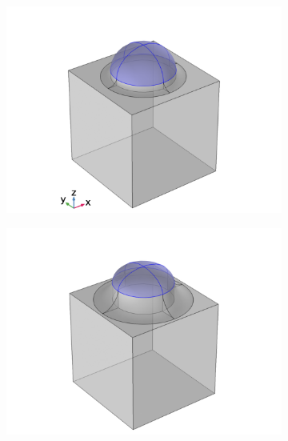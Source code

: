 \begin{figure}[htb!]
    \begin{subfigure}{0.24\textwidth}
        \centering
        \includegraphics[width=\linewidth, trim=2cm 0cm 2cm 0cm, clip]{figures/ch4/implem/geometry/Sample6_markedAu_xyz(1).png}
        \caption{}
    \end{subfigure}
    \begin{subfigure}{0.24\textwidth}
        \centering
        \includegraphics[width=\linewidth, trim=2cm 0cm 2cm 0cm, clip]{figures/ch4/implem/geometry/Sample5A_markedAu.png}
        \caption{}
    \end{subfigure}
    \begin{subfigure}{0.24\textwidth}

\end{subfigure}
\end{figure}
